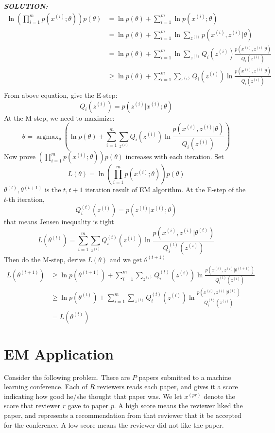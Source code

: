 \documentclass{article}
\DeclareMathOperator*{\argmax}{argmax}
\theoremstyle{definition}
\theoremstyle{definition}
\theoremstyle{remark}
\begin{document}
\emph{\textbf{SOLUTION:}}\\
\begin{equation}\nonumber
\begin{aligned}
\ln(\prod_{i = 1}^mp(x^{(i)};\theta))p(\theta) &= \ln p(\theta)+ \sum_{i=1}^m\ln p(x^{(i)};\theta)\\
 &= \ln p(\theta)+ \sum_{i=1}^m\ln \sum_{z^{(i)}}p(x^{(i)},z^{(i)}|\theta)\\
 &= \ln p(\theta)+ \sum_{i=1}^m\ln \sum_{z^{(i)}}Q_i(z^{(i)})\frac{p(x^{(i)},z^{(i)}|\theta)}{Q_i(z^{(i)})}\\
 &\geq \ln p(\theta)+ \sum_{i=1}^m\sum_{z^{(i)}}Q_i(z^{(i)})\ln\frac{p(x^{(i)},z^{(i)}|\theta)}{Q_i(z^{(i)})}\\
\end{aligned}
\end{equation}
From above equation, give the E-step:
\[Q_i(z^{(i)})=p(z^{(i)}|x^{(i)};\theta)\]
At the M-step, we need to maximize:
\[\theta = \argmax_{\theta}\left(\ln p(\theta)+ \sum_{i=1}^m\sum_{z^{(i)}}Q_i(z^{(i)})\ln\frac{p(x^{(i)},z^{(i)}|\theta)}{Q_i(z^{(i)})}\right)\]
Now prove $(\prod_{i = 1}^mp(x^{(i)};\theta))p(\theta)$ increases with each iteration. Set
\[L(\theta) = \ln(\prod_{i = 1}^mp(x^{(i)};\theta))p(\theta)\]
$\theta^{(t)},\theta^{(t+1)}$ is the $t, t+1$ iteration result of EM algorithm. At the E-step of the $t$-th iteration,
\[Q_i^{(t)}(z^{(i)})=p(z^{(i)}|x^{(i)};\theta)\]
that means Jensen inequality is tight
\[L(\theta^{(t)})=\sum_{i=1}^m\sum_{z^{(i)}}Q_i^{(t)}(z^{(i)})\ln\frac{p(x^{(i)},z^{(i)}|\theta^{(t)})}{Q_i^{(t)}(z^{(i)})}\]
Then do the M-step, derive $L(\theta)$ and we get $\theta^{(t+1)}$
\begin{equation}\nonumber
\begin{aligned}
L(\theta^{(t+1)})
&\geq \ln p(\theta^{(t+1)})+ \sum_{i=1}^m\sum_{z^{(i)}}Q_i^{(t)}(z^{(i)})\ln\frac{p(x^{(i)},z^{(i)}|\theta^{(t+1)})}{Q_i^{(t)}(z^{(i)})}\\
&\geq\ln p(\theta^{(t)})+ \sum_{i=1}^m\sum_{z^{(i)}}Q_i^{(t)}(z^{(i)})\ln\frac{p(x^{(i)},z^{(i)}|\theta^{(t)})}{Q_i^{(t)}(z^{(i)})}\\
 &= L(\theta^{(t)})
\end{aligned}
\end{equation}
\section*{EM Application}
Consider the following problem. There are $P$ papers submitted to a machine learning
conference. Each of $R$ reviewers reads each paper, and gives it a score indicating how good
he/she thought that paper was. We let $x^{(pr)}$ denote the score that reviewer $r$ gave to paper
$p$. A high score means the reviewer liked the paper, and represents a recommendation from
that reviewer that it be accepted for the conference. A low score means the reviewer did
not like the paper.
\end{document}
